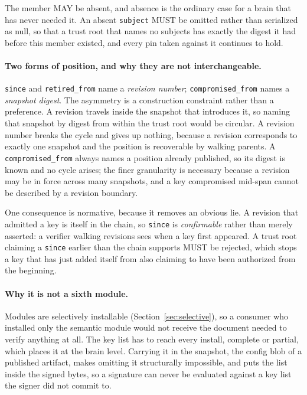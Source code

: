 \documentclass[11pt,a4paper]{article}
\begin{document}
The member MAY be absent, and absence is the ordinary case for a brain that has
never needed it. An absent \texttt{subject} MUST be omitted rather than
serialized as null, so that a trust root that names no subjects has exactly the
digest it had before this member existed, and every pin taken against it
continues to hold.

\paragraph{Two forms of position, and why they are not interchangeable.}
\texttt{since} and \texttt{retired\_from} name a \emph{revision number};
\texttt{compromised\_from} names a \emph{snapshot digest}. The asymmetry is a construction constraint rather than a preference. A
revision travels inside the snapshot that introduces it, so naming that
snapshot by digest from within the trust root would be circular. A revision
number breaks the cycle and gives up nothing, because a revision corresponds
to exactly one snapshot and the position is recoverable by walking parents. A
\texttt{compromised\_from} always names a position already published, so its
digest is known and no cycle arises; the finer granularity is necessary
because a revision may be in force across many snapshots, and a key
compromised mid-span cannot be described by a revision boundary.

One consequence is normative, because it removes an obvious lie. A revision
that admitted a key is itself in the chain, so \texttt{since} is
\emph{confirmable} rather than merely asserted: a verifier walking revisions sees
when a key first appeared. A trust root claiming a \texttt{since} earlier than the chain supports MUST be
rejected, which stops a key that has just added itself from also claiming to
have been authorized from the beginning.

\paragraph{Why it is not a sixth module.}
Modules are selectively installable (Section~\ref{sec:selective}), so a
consumer who installed only the semantic module would not receive the document
needed to verify anything at all. The key list has to reach every install,
complete or partial, which places it at the brain level. Carrying it in the
snapshot, the config blob of a published artifact, makes omitting it
structurally impossible, and puts the list inside the signed bytes, so a
signature can never be evaluated against a key list the signer did not commit
to.
\end{document}

